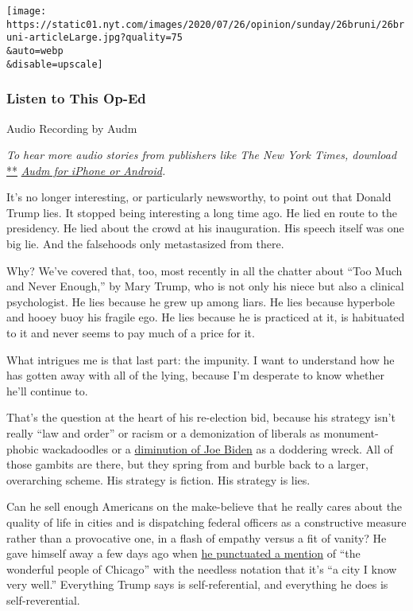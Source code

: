 \texttt{[image: https://static01.nyt.com/images/2020/07/26/opinion/sunday/26bruni/26bruni-articleLarge.jpg?quality=75\\\&auto=webp\\\&disable=upscale]}

\hypertarget{listen-to-this-op-ed}{%
\subsubsection{Listen to This Op-Ed}\label{listen-to-this-op-ed}}

Audio Recording by Audm

\emph{To hear more audio stories from publishers like The New York
Times, download}
\href{https://www.audm.com/?utm_source=nytmag\&utm_medium=embed\&utm_campaign=left_behind_draper}{**}
\href{https://www.audm.com/?utm_source=nytopinion\&utm_medium=embed\&utm_campaign=trump_history_cosmos}{\emph{Audm
for iPhone or Android}}\emph{.}

It's no longer interesting, or particularly newsworthy, to point out
that Donald Trump lies. It stopped being interesting a long time ago. He
lied en route to the presidency. He lied about the crowd at his
inauguration. His speech itself was one big lie. And the falsehoods only
metastasized from there.

Why? We've covered that, too, most recently in all the chatter about
``Too Much and Never Enough,'' by Mary Trump, who is not only his niece
but also a clinical psychologist. He lies because he grew up among
liars. He lies because hyperbole and hooey buoy his fragile ego. He lies
because he is practiced at it, is habituated to it and never seems to
pay much of a price for it.

What intrigues me is that last part: the impunity. I want to understand
how he has gotten away with all of the lying, because I'm desperate to
know whether he'll continue to.

That's the question at the heart of his re-election bid, because his
strategy isn't really ``law and order'' or racism or a demonization of
liberals as monument-phobic wackadoodles or a
\href{https://www.nytimes.com/2020/05/17/opinion/trump-biden-age.html}{diminution
of Joe Biden} as a doddering wreck. All of those gambits are there, but
they spring from and burble back to a larger, overarching scheme. His
strategy is fiction. His strategy is lies.

Can he sell enough Americans on the make-believe that he really cares
about the quality of life in cities and is dispatching federal officers
as a constructive measure rather than a provocative one, in a flash of
empathy versus a fit of vanity? He gave himself away a few days ago when
\href{https://www.whitehouse.gov/briefings-statements/remarks-president-trump-operation-legend-combatting-violent-crime-american-cities/}{he
punctuated a mention} of ``the wonderful people of Chicago'' with the
needless notation that it's ``a city I know very well.'' Everything
Trump says is self-referential, and everything he does is
self-reverential.


